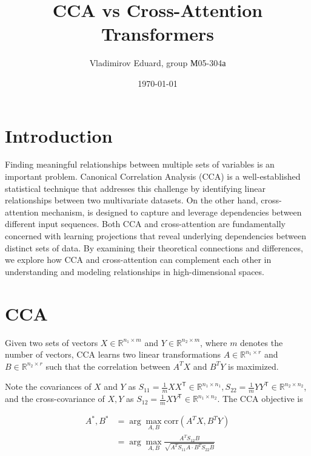 \documentclass[a4paper,14pt]{article}
\author{Vladimirov Eduard, group М05-304а}
\title{\textbf{CCA vs Cross-Attention Transformers}}
\date{\today}
\newcommand{\dR}{\mathbb{R}}
\newcommand{\T}{^{\mathsf{T}}}
\theoremstyle{plain} %
\theoremstyle{definition} %
\theoremstyle{remark} %
\begin{document}
	\maketitle
	
	\section*{Introduction}
	
	Finding meaningful relationships between multiple sets of variables is an important problem.
	Canonical Correlation Analysis (CCA) is a well-established statistical technique that addresses this challenge by identifying linear relationships between two multivariate datasets.
	On the other hand, cross-attention mechanism, is designed to capture and leverage dependencies between different input sequences.
	Both CCA and cross-attention are fundamentally concerned with learning projections that reveal underlying dependencies between distinct sets of data.
	By examining their theoretical connections and differences, we explore how CCA and cross-attention can complement each other in understanding and modeling relationships in high-dimensional spaces.
	
	\section*{CCA}
	
	Given two sets of vectors $X \in \mathbb{R}^{n_1 \times m}$ and $Y \in \mathbb{R}^{n_2 \times m}$, where $m$ denotes the number of vectors, CCA learns two linear transformations $A \in \mathbb{R}^{n_1 \times r}$ and $B \in \mathbb{R}^{n_2 \times r}$ such that the correlation between $A^T X$ and $B^T Y$ is maximized.
	
	Note the covariances of $X$ and $Y$ as $S_{11} = \frac{1}{m} X X\T \in \dR^{n_1 \times n_1}, S_{22} = \frac{1}{m} Y Y\T \in \dR^{n_2 \times n_2}$, and the cross-covariance of $X, Y$ as $S_{12} = \frac{1}{m} X Y\T \in \dR^{n_1 \times n_2}$. The CCA objective is 
	
	\begin{equation}
		\begin{aligned}
			A^*, B^* &= \arg \max_{A,B} \text{corr}(A^T X, B^T Y) \\
			&= \arg \max_{A,B} \frac{A^T S_{12} B}{\sqrt{A^T S_{11} A \cdot B^T S_{22} B}}
		\end{aligned}
		\label{cca:objective}
	\end{equation}
	
\end{document}
